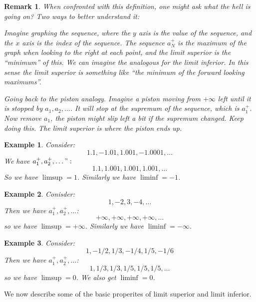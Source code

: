 \documentclass{article}
\newtheorem{example}{Example}[subsection]
\newtheorem{remark}{Remark}[subsection]
\begin{document}
\begin{remark}
	When confronted with this definition, one might ask what
	the hell is going on? Two ways to better understand it:

	Imagine graphing the sequence, where the $y$ axis 
	is the value of the sequence, and the $x$ axis is
	the index of the sequence. The sequence 
	$a_N^+$ is the maximum of the graph when looking
	to the right at each point, and the limit superior
	is the ``minimum'' of this. We can imagine the
	analogous for the limit inferior. In this 
	sense the limit superior is something like 
	``the minimum of the forward looking maximums''.

	Going back to the piston analogy. Imagine 
	a piston moving from $+\infty$ left until 
	it is stopped by $a_1, a_2, \dots$. It 
	will stop at the supremum of the sequence, 
	which is $a_1^+$. Now remove $a_1$, the piston 
	might slip left a bit if the supremum changed.
	Keep doing this. The limit superior is
	where the piston ends up.
\end{remark}

\begin{example}
	Consider:
	$$
	1.1, -1.01, 1.001, -1.0001, \dots
	$$
	We have $a_1^+, a_2^+, \dots":$
	$$
	1.1, 1.001, 1.001, 1.001, \dots	
	$$
	So we have $\limsup = 1$. Similarly we have
	$\liminf = -1$.
\end{example}

\begin{example}
	Conisder:
	$$
	1, -2, 3, -4, \dots
	$$
	Then we have $a_1^+, a_2^+, \dots$:
	$$
	+\infty, +\infty, +\infty, +\infty, \dots
	$$
	so we have $\limsup = +\infty$. Similarly we have
	$\liminf = -\infty$.
\end{example}

\begin{example}
	Consider:
	$$
	1, -1/2, 1/3, -1/4, 1/5, -1/6
	$$
	Then we have $a_1^+, a_2^+, \dots$:
	$$
	1, 1/3, 1/3, 1/5, 1/5, 1/5, \dots
	$$
	so we have $\limsup = 0$. We also 
	get $\liminf = 0$.
\end{example}

We now describe some of the basic properites of limit superior
and limit inferior.
\end{document}
